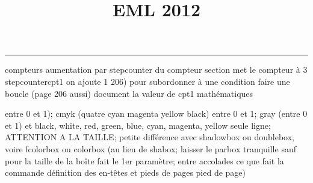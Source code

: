 \documentclass[11pt]{article}%
\title{\bf \vspace{-2cm} EML 2012} %
\author{} %
\date{} %
\renewcommand{\headrulewidth}{0pt}%
\renewcommand{\footrulewidth}{0.4pt}%
\begin{document}
\maketitle %
\vspace{-1.4cm}\hrule %
\thispagestyle{fancy}

\vspace*{.2cm}



compteurs%
aumentation par stepcounter du compteur section%
met le compteur à 3%
stepcounter{cpt1} on ajoute 1%
206) pour subordonner à une condition %
faire une boucle (page 206 aussi) %
document la valeur de cpt1 
mathématiques\newcommand{\ch}{\operatorname{ch}} 
\newcommand{\sh}{\operatorname{sh}}
\renewcommand{\tanh}{\operatorname{th}}
\renewcommand{\sinh}{\operatorname{sh}}
\renewcommand{\cosh}{\operatorname{ch}}
\newcommand{\argsh}{\operatorname{argsh}}
\newcommand{\argch}{\operatorname{argch}}
\newcommand{\argth}{\operatorname{argth}}
\newcommand{\ker}{\operatorname{Ker}}
\renewcommand{\im}{\operatorname{Im}}
\newcommand{\rg}{\operatorname{rg}}
\newcommand{\Id}{\operatorname{Id}}
\newcommand{\id}{\operatorname{id}}
\renewcommand{\leq}{\leq}
\renewcommand{\geq}{\geq }

entre 0 et 1); cmyk (quatre cyan magenta yellow black) entre 0 et 1;
gray (entre 0 et 1) et black, white, red, green, blue, cyan, magenta,
yellow%
seule ligne; ATTENTION A LA TAILLE; petite différence avec shadowbox ou
doublebox, voire fcolorbox ou colorbox (au lieu de shabox; laisser le
parbox tranquille sauf pour la taille de la boîte
\newcommand{\Tbox}[1]{\begin{center} \shabox{\parbox{0.6
\linewidth}{#1}} \end{center}} %
fait le 1er paramètre; entre accolades ce que fait la commande
définition des en-têtes et pieds de pages\pagestyle{fancy}
\chead{}
\rfoot[ \ \thepage]{\thepage}
\cfoot{}
\lfoot{}
\thispagestyle{fancy} %
pied de page)\renewcommand{\footrulewidth}{0.4pt}
\renewcommand{\headrulewidth}{0.4pt}
\end{document}
